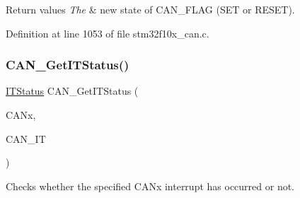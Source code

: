 \begin{DoxyRetVals}{Return values}
{\em The} & new state of C\+A\+N\+\_\+\+F\+L\+AG (S\+ET or R\+E\+S\+ET). \\
\hline
\end{DoxyRetVals}


Definition at line 1053 of file stm32f10x\+\_\+can.\+c.

\mbox{\label{group___c_a_n___exported___functions_ga9aca05b3013e1b3438f3559f80b33c82}} 
\subsubsection{\texorpdfstring{C\+A\+N\+\_\+\+Get\+I\+T\+Status()}{CAN\_GetITStatus()}}
{\footnotesize\ttfamily \hyperlink{group___exported__types_gaacbd7ed539db0aacd973a0f6eca34074}{I\+T\+Status} C\+A\+N\+\_\+\+Get\+I\+T\+Status (\begin{DoxyParamCaption}\item[{\hyperlink{struct_c_a_n___type_def}{C\+A\+N\+\_\+\+Type\+Def} $\ast$}]{C\+A\+Nx,  }\item[{uint32\+\_\+t}]{C\+A\+N\+\_\+\+IT }\end{DoxyParamCaption})}



Checks whether the specified C\+A\+Nx interrupt has occurred or not. 


